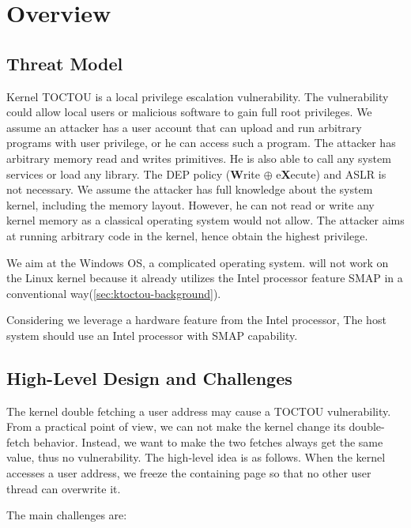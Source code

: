 \section{Overview}
\label{sec:ktoctou-overview}




\subsection{Threat Model}
\label{sec:ktoctou-threatmodel}

Kernel TOCTOU is a local privilege escalation vulnerability. The vulnerability could allow local users or malicious software to gain full root privileges. We assume an attacker has a user account that can upload and run arbitrary programs with user privilege, or he can access such a program. The attacker has arbitrary memory read and writes primitives. He is also able to call any system services or load any library. The DEP policy (\textbf{W}rite $\oplus$ e\textbf{X}ecute) and ASLR is not necessary. We assume the attacker has full knowledge about the system kernel, including the memory layout. However, he can not read or write any kernel memory as a classical operating system would not allow. The attacker aims at running arbitrary code in the kernel, hence obtain the highest privilege.

We aim at the Windows OS, a complicated operating system. \name will not work on the Linux kernel because it already utilizes the Intel processor feature SMAP in a conventional way(\autoref{sec:ktoctou-background}).


Considering we leverage a hardware feature from the Intel processor, The host system should use an Intel processor with SMAP capability.



\subsection{High-Level Design and Challenges}

The kernel double fetching a user address may cause a TOCTOU vulnerability. From a practical point of view, we can not make the kernel change its double-fetch behavior. Instead, we want to make the two fetches always get the same value, thus no vulnerability. The high-level idea is as follows.  When the kernel accesses a user address, we freeze the containing page so that no other user thread can overwrite it.


The main challenges are:


